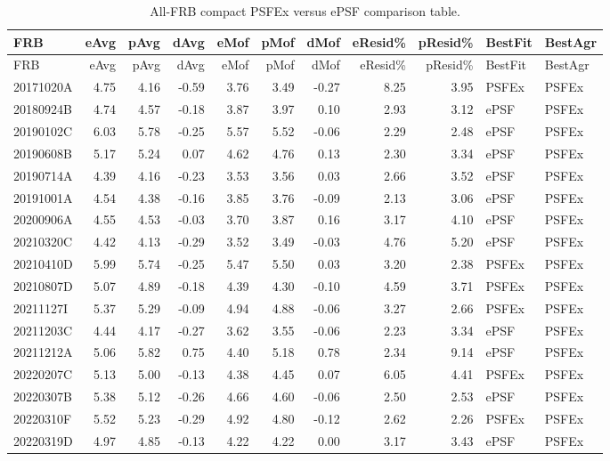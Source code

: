 \begin{longtable}{lrrrrrrrrll}
\caption{All-FRB compact PSFEx versus ePSF comparison table.}\label{tab:psfex_all_frbs_compact} \\
\hline
 FRB & eAvg & pAvg & dAvg & eMof & pMof & dMof & eResid\% & pResid\% & BestFit & BestAgr \\
\hline
\endfirsthead
\hline
 FRB & eAvg & pAvg & dAvg & eMof & pMof & dMof & eResid\% & pResid\% & BestFit & BestAgr \\
\hline
\endhead
 20171020A & 4.75 & 4.16 & -0.59 & 3.76 & 3.49 & -0.27 & 8.25 & 3.95 & PSFEx & PSFEx \\
 20180924B & 4.74 & 4.57 & -0.18 & 3.87 & 3.97 & 0.10 & 2.93 & 3.12 & ePSF & PSFEx \\
 20190102C & 6.03 & 5.78 & -0.25 & 5.57 & 5.52 & -0.06 & 2.29 & 2.48 & ePSF & PSFEx \\
 20190608B & 5.17 & 5.24 & 0.07 & 4.62 & 4.76 & 0.13 & 2.30 & 3.34 & ePSF & PSFEx \\
 20190714A & 4.39 & 4.16 & -0.23 & 3.53 & 3.56 & 0.03 & 2.66 & 3.52 & ePSF & PSFEx \\
 20191001A & 4.54 & 4.38 & -0.16 & 3.85 & 3.76 & -0.09 & 2.13 & 3.06 & ePSF & PSFEx \\
 20200906A & 4.55 & 4.53 & -0.03 & 3.70 & 3.87 & 0.16 & 3.17 & 4.10 & ePSF & PSFEx \\
 20210320C & 4.42 & 4.13 & -0.29 & 3.52 & 3.49 & -0.03 & 4.76 & 5.20 & ePSF & PSFEx \\
 20210410D & 5.99 & 5.74 & -0.25 & 5.47 & 5.50 & 0.03 & 3.20 & 2.38 & PSFEx & PSFEx \\
 20210807D & 5.07 & 4.89 & -0.18 & 4.39 & 4.30 & -0.10 & 4.59 & 3.71 & PSFEx & PSFEx \\
 20211127I & 5.37 & 5.29 & -0.09 & 4.94 & 4.88 & -0.06 & 3.27 & 2.66 & PSFEx & PSFEx \\
 20211203C & 4.44 & 4.17 & -0.27 & 3.62 & 3.55 & -0.06 & 2.23 & 3.34 & ePSF & PSFEx \\
 20211212A & 5.06 & 5.82 & 0.75 & 4.40 & 5.18 & 0.78 & 2.34 & 9.14 & ePSF & PSFEx \\
 20220207C & 5.13 & 5.00 & -0.13 & 4.38 & 4.45 & 0.07 & 6.05 & 4.41 & PSFEx & PSFEx \\
 20220307B & 5.38 & 5.12 & -0.26 & 4.66 & 4.60 & -0.06 & 2.50 & 2.53 & ePSF & PSFEx \\
 20220310F & 5.52 & 5.23 & -0.29 & 4.92 & 4.80 & -0.12 & 2.62 & 2.26 & PSFEx & PSFEx \\
 20220319D & 4.97 & 4.85 & -0.13 & 4.22 & 4.22 & 0.00 & 3.17 & 3.43 & ePSF & PSFEx \\

\end{longtable}
